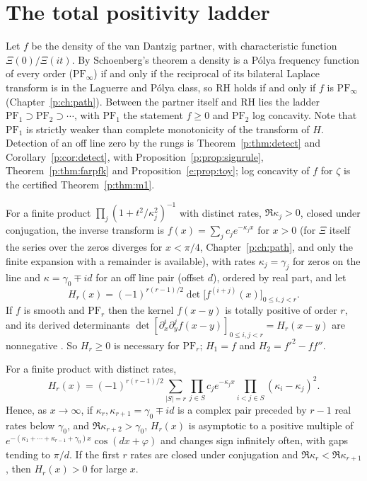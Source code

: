 \section{The total positivity ladder}\label{mh:sec:ladder}

Let $f$ be the density of the van Dantzig partner, with characteristic function $\Xi(0)/\Xi(it)$. By Schoenberg's theorem \cite{Schoenberg51} a density is a P\'olya frequency function of every order ($\mathrm{PF}_\infty$) if and only if the reciprocal of its bilateral Laplace transform is in the Laguerre and P\'olya class, so RH holds if and only if $f$ is $\mathrm{PF}_\infty$ (Chapter~\ref{p:ch:path}). Between the partner itself and RH lies the ladder $\mathrm{PF}_1\supset\mathrm{PF}_2\supset\cdots$, with $\mathrm{PF}_1$ the statement $f\ge0$ and $\mathrm{PF}_2$ log concavity. Note that $\mathrm{PF}_1$ is strictly weaker than complete monotonicity of the transform of $H$. Detection of an off line zero by the rungs is Theorem~\ref{p:thm:detect} and Corollary~\ref{p:cor:detect}, with Proposition~\ref{p:prop:signrule}, Theorem~\ref{p:thm:farpfk} and Proposition~\ref{e:prop:toy}; log concavity of $f$ for $\zeta$ is the certified Theorem~\ref{p:thm:m1}.

For a finite product $\prod_j(1+t^2/\kappa_j^2)^{-1}$ with distinct rates, $\Re\kappa_j>0$, closed under conjugation, the inverse transform is $f(x)=\sum_jc_je^{-\kappa_jx}$ for $x>0$ (for $\Xi$ itself the series over the zeros diverges for $x<\pi/4$, Chapter~\ref{p:ch:path}, and only the finite expansion with a remainder is available), with rates $\kappa_j=\gamma_j$ for zeros on the line and $\kappa=\gamma_0\mp id$ for an off line pair (offset $d$), ordered by real part, and let
\[
H_r(x)=(-1)^{r(r-1)/2}\det\big[f^{(i+j)}(x)\big]_{0\le i,j<r}.
\]
If $f$ is smooth and $\mathrm{PF}_r$ then the kernel $f(x-y)$ is totally positive of order $r$, and its derived determinants $\det[\partial_x^i\partial_y^jf(x-y)]_{0\le i,j<r}=H_r(x-y)$ are nonnegative \cite{Karlin68}. So $H_r\ge0$ is necessary for $\mathrm{PF}_r$; $H_1=f$ and $H_2=f'^2-ff''$.

\begin{proposition}\label{mh:prop:hankel}
For a finite product with distinct rates,
\[
H_r(x)=(-1)^{r(r-1)/2}\sum_{|S|=r}\prod_{j\in S}c_je^{-\kappa_jx}\prod_{i<j\in S}(\kappa_i-\kappa_j)^2.
\]
Hence, as $x\to\infty$, if $\kappa_r,\kappa_{r+1}=\gamma_0\mp id$ is a complex pair preceded by $r-1$ real rates below $\gamma_0$, and $\Re\kappa_{r+2}>\gamma_0$, $H_r(x)$ is asymptotic to a positive multiple of $e^{-(\kappa_1+\cdots+\kappa_{r-1}+\gamma_0)x}\cos(dx+\varphi)$ and changes sign infinitely often, with gaps tending to $\pi/d$. If the first $r$ rates are closed under conjugation and $\Re\kappa_r<\Re\kappa_{r+1}$, then $H_r(x)>0$ for large $x$.
\end{proposition}

